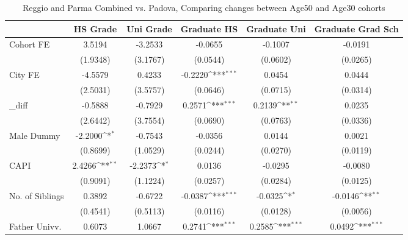 \begin{table}[htbp]\centering
\def\sym#1{\ifmmode^{#1}\else\(^{#1}\)\fi}
\caption{Reggio and Parma Combined vs. Padova, Comparing changes between Age50 and Age30 cohorts}
\begin{tabular}{l*{5}{c}}
\toprule
            &\multicolumn{1}{c}{HS Grade}&\multicolumn{1}{c}{Uni Grade}&\multicolumn{1}{c}{Graduate HS}&\multicolumn{1}{c}{Graduate Uni}&\multicolumn{1}{c}{Graduate Grad Sch}\\
\midrule
Cohort FE   &      3.5194         &     -3.2533         &     -0.0655         &     -0.1007         &     -0.0191         \\
            &    (1.9348)         &    (3.1767)         &    (0.0544)         &    (0.0602)         &    (0.0265)         \\
\addlinespace
City FE     &     -4.5579         &      0.4233         &     -0.2220\sym{***}&      0.0454         &      0.0444         \\
            &    (2.5031)         &    (3.5757)         &    (0.0646)         &    (0.0715)         &    (0.0314)         \\
\addlinespace
\_diff       &     -0.5888         &     -0.7929         &      0.2571\sym{***}&      0.2139\sym{**} &      0.0235         \\
            &    (2.6442)         &    (3.7554)         &    (0.0690)         &    (0.0763)         &    (0.0336)         \\
\addlinespace
Male Dummy  &     -2.2000\sym{*}  &     -0.7543         &     -0.0356         &      0.0144         &      0.0021         \\
            &    (0.8699)         &    (1.0529)         &    (0.0244)         &    (0.0270)         &    (0.0119)         \\
\addlinespace
CAPI        &      2.4266\sym{**} &     -2.2373\sym{*}  &      0.0136         &     -0.0295         &     -0.0080         \\
            &    (0.9091)         &    (1.1224)         &    (0.0257)         &    (0.0284)         &    (0.0125)         \\
\addlinespace
No. of Siblings&      0.3892         &     -0.6722         &     -0.0387\sym{***}&     -0.0325\sym{*}  &     -0.0146\sym{**} \\
            &    (0.4541)         &    (0.5113)         &    (0.0116)         &    (0.0128)         &    (0.0056)         \\
\addlinespace
Father Univv.&      0.6073         &      1.0667         &      0.2741\sym{***}&      0.2585\sym{***}&      0.0492\sym{***}\\

\end{tabular}
\end{table}
